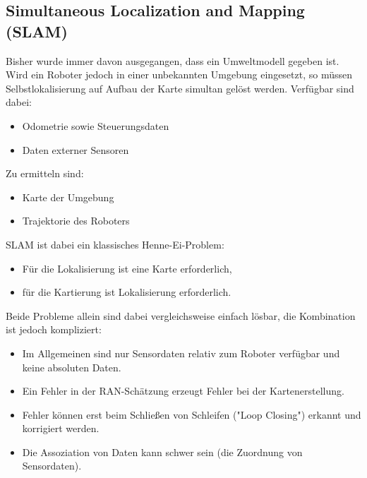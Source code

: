 \documentclass[a4paper, 11pt, accentcolor = tud3b]{tudreport}
\begin{document}
			\subsection{Simultaneous Localization and Mapping (SLAM)}
				\label{sec:slam}
			
				Bisher wurde immer davon ausgegangen, dass ein Umweltmodell gegeben ist. Wird ein Roboter jedoch in einer unbekannten Umgebung eingesetzt, so müssen Selbstlokalisierung auf Aufbau der Karte simultan gelöst werden. Verfügbar sind dabei:
				\begin{itemize}
					\item Odometrie sowie Steuerungsdaten
					\item Daten externer Sensoren
				\end{itemize}
				Zu ermitteln sind:
				\begin{itemize}
					\item Karte der Umgebung
					\item Trajektorie des Roboters
				\end{itemize}
			
				SLAM ist dabei ein klassisches Henne-Ei-Problem:
				\begin{itemize}
					\item Für die Lokalisierung ist eine Karte erforderlich,
					\item für die Kartierung ist Lokalisierung erforderlich.
				\end{itemize}
				Beide Probleme allein sind dabei vergleichsweise einfach lösbar, die Kombination ist jedoch kompliziert:
				\begin{itemize}
					\item Im Allgemeinen sind nur Sensordaten relativ zum Roboter verfügbar und keine absoluten Daten.
					\item Ein Fehler in der RAN-Schätzung erzeugt Fehler bei der Kartenerstellung.
					\item Fehler können erst beim Schließen von Schleifen ("Loop Closing") erkannt und korrigiert werden.
					\item Die Assoziation von Daten kann schwer sein (die Zuordnung von Sensordaten).
				\end{itemize}
			
\end{document}
